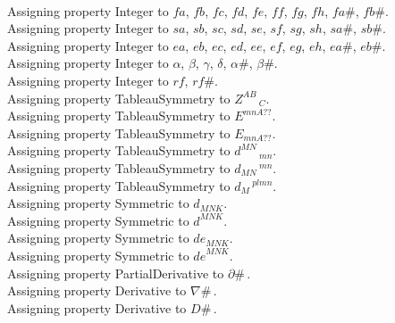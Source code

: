 \documentclass[11pt]{article}
\begin{document}
\\
Assigning property Integer to $fa$, $fb$, $fc$, $fd$, $fe$, $ff$, $fg$, $fh$, $fa\#$, $fb\#$.
\\
Assigning property Integer to $sa$, $sb$, $sc$, $sd$, $se$, $sf$, $sg$, $sh$, $sa\#$, $sb\#$.
\\
Assigning property Integer to $ea$, $eb$, $ec$, $ed$, $ee$, $ef$, $eg$, $eh$, $ea\#$, $eb\#$.
\\
Assigning property Integer to $\alpha$, $\beta$, $\gamma$, $\delta$, $\alpha\#$, $\beta\#$.
\\
Assigning property Integer to $rf$, $rf\#$.
\\
Assigning property TableauSymmetry to ${Z}^{A B}\,_{C}$.
\\
Assigning property TableauSymmetry to ${E}^{m n A??}$.
\\
Assigning property TableauSymmetry to ${E}_{m n A??}$.
\\
Assigning property TableauSymmetry to ${d}^{M N}\,_{m n}$.
\\
Assigning property TableauSymmetry to ${d}_{M N}\,^{m n}$.
\\
Assigning property TableauSymmetry to ${d}_{M}\,^{p l m n}$.
\\
Assigning property Symmetric to ${d}_{M N K}$.
\\
Assigning property Symmetric to ${d}^{M N K}$.
\\
Assigning property Symmetric to ${de}_{M N K}$.
\\
Assigning property Symmetric to ${de}^{M N K}$.
\\
Assigning property PartialDerivative to $\partial{\#}\, $.
\\
Assigning property Derivative to $\nabla{\#}\, $.
\\
Assigning property Derivative to $D{\#}\, $.
\\
\end{document}
